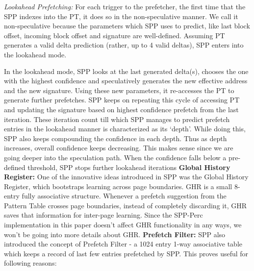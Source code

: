 \documentclass{sig-alternate}
\begin{document}
\textit{Lookahead Prefetching:} For each trigger to the prefetcher, the first time that the SPP indexes into the PT, it does so in the non-speculative manner. 
We call it non-speculative because the parameters which SPP uses to predict, like last block offset, incoming block offset and signature are well-defined. 
Assuming PT generates a valid delta prediction (rather, up to 4 valid deltas), SPP enters into the lookahead mode.

In the lookahead mode, SPP looks at the last generated delta(s), chooses the one with the highest confidence and speculatively generates the new effective address and the new signature. 
Using these new parameters, it re-accesses the PT to generate further prefetches. 
SPP keeps on repeating this cycle of accessing PT and updating the signature based on highest confidence prefetch from the last iteration. 
These iteration count till which SPP manages to predict prefetch entries in the lookahead manner is characterized as its `depth'. 
While doing this, SPP also keeps compounding the confidence in each depth. 
Thus as depth increases, overall confidence keeps decreasing. 
This makes sense since we are going deeper into the speculation path. 
When the confidence falls below a pre-defined threshold, SPP stops further lookahead iterations
\newline
\newline
\textbf{Global History Register:} One of the innovative ideas introduced in SPP was the Global History Register, which bootstraps learning across page boundaries.
GHR is a small 8-entry fully associative structure. 
Whenever a prefetch suggestion from the Pattern Table crosses page boundaries, instead of completely discarding it, GHR saves that information for inter-page learning.
Since the SPP-Perc implementation in this paper doesn't affect GHR functionality in any ways, we won't be going into more details about GHR.
\newline
\newline
\textbf{Prefetch Filter:} SPP also introduced the concept of Prefetch Filter - a 1024 entry 1-way associative table which keeps a record of last few entries prefetched by SPP. 
This proves useful for following reasons:
\end{document}
